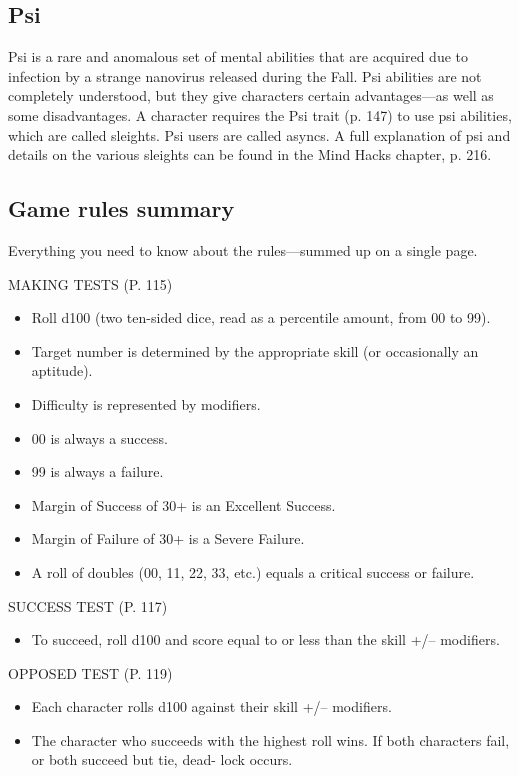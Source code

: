\subsection{Psi}
\label{sec:psi}

Psi is a rare and anomalous set of mental abilities that are acquired
due to infection by a strange nanovirus released during the Fall. Psi
abilities are not completely understood, but they give characters
certain advantages—as well as some disadvantages. A character requires
the Psi trait (p. 147) to use psi abilities, which are called
sleights. Psi users are called asyncs. A full explanation of psi and
details on the various sleights can be found in the Mind Hacks
chapter, p. 216.


\subsection{Game rules summary}
\label{sec:game-rules-summary}

Everything you need to know about the rules—summed up on a single
page.


MAKING TESTS (P. 115)

\begin{itemize}
\item Roll d100 (two ten-sided dice, read as a percentile amount, from
  00 to 99).
\item Target number is determined by the appropriate skill (or
  occasionally an aptitude).
\item Difficulty is represented by modifiers.
\item 00 is always a success.
\item 99 is always a failure.
\item Margin of Success of 30+ is an Excellent Success.
\item Margin of Failure of 30+ is a Severe Failure.
\item A roll of doubles (00, 11, 22, 33, etc.) equals a critical
  success or failure.
\end{itemize}

SUCCESS TEST (P. 117)

\begin{itemize}
\item To succeed, roll d100 and score equal to or less than the skill
  +/– modifiers.
\end{itemize}

OPPOSED TEST (P. 119)

\begin{itemize}
\item Each character rolls d100 against their skill +/– modifiers.
\item The character who succeeds with the highest roll wins.  If both
  characters fail, or both succeed but tie, dead- lock occurs.
\end{itemize}

